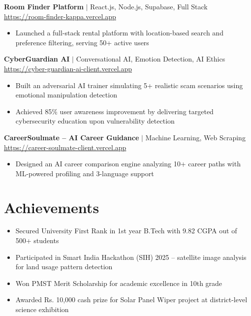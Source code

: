 \documentclass[a4paper,10pt]{article}
\begin{document}
\vspace{2pt}
\textbf{Room Finder Platform} $|$ React.js, Node.js, Supabase, Full Stack \hfill \href{https://room-finder-kappa.vercel.app/}{https://room-finder-kappa.vercel.app}
\begin{itemize}[leftmargin=12pt, nosep]
    \item Launched a full-stack rental platform with location-based search and preference filtering, serving 50+ active users
\end{itemize}

\vspace{2pt}
\textbf{CyberGuardian AI} $|$ Conversational AI, Emotion Detection, AI Ethics \hfill \href{https://cyber-guardian-ai-client.vercel.app/}{https://cyber-guardian-ai-client.vercel.app}
\begin{itemize}[leftmargin=12pt, nosep]
    \item Built an adversarial AI trainer simulating 5+ realistic scam scenarios using emotional manipulation detection
    \item Achieved 85\% user awareness improvement by delivering targeted cybersecurity education upon vulnerability detection
\end{itemize}

\vspace{2pt}
\textbf{CareerSoulmate -- AI Career Guidance} $|$ Machine Learning, Web Scraping \hfill \href{https://career-soulmate-client.vercel.app/}{https://career-soulmate-client.vercel.app}
\begin{itemize}[leftmargin=12pt, nosep]
    \item Designed an AI career comparison engine analyzing 10+ career paths with ML-powered profiling and 3-language support
\end{itemize}

\section{Achievements}
\begin{itemize}[leftmargin=12pt, nosep]
    \item Secured University First Rank in 1st year B.Tech with 9.82 CGPA out of 500+ students
    \item Participated in Smart India Hackathon (SIH) 2025 -- satellite image analysis for land usage pattern detection
    \item Won PMST Merit Scholarship for academic excellence in 10th grade
    \item Awarded Rs. 10,000 cash prize for Solar Panel Wiper project at district-level science exhibition
\end{itemize}
\end{document}
